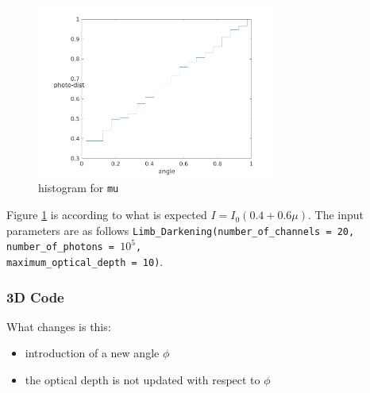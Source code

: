 \documentclass[../main/main.tex]{subfiles}
\begin{document}
\begin{figure}[!htp]
\centering
\includegraphics[width=0.7\textwidth]{../../introductory_exercises/limb_darkening/data/number_channels20number_photons100000max_opt_depth10.png}
\caption{histogram for \texttt{mu}}
\label{2D_mu}
\end{figure}
Figure \ref{2D_mu} is according to what is expected $I = I_0(0.4+0.6\mu)$. The input parameters are as follows \texttt{Limb\_Darkening(number\_of\_channels = 20, number\_of\_photons = $10^5$, \\ maximum\_optical\_depth = 10)}.

\newpage
\subsubsection{3D Code}
\label{3D_limb_darkening}

What changes is this: 
\begin{itemize}
\item introduction of a new angle $\phi$
\item the optical depth is not updated with respect to $\phi$ 
\end{itemize}
\end{document}
